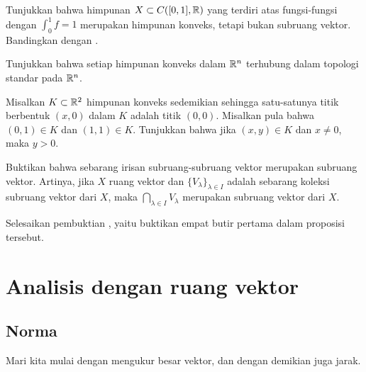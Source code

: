 \begin{exercise} \label{exercise:intoneconvex}
Tunjukkan bahwa himpunan $X \subset C([0,1],{\mathbb{R}})$ yang terdiri atas fungsi-fungsi
dengan $\int_0^1 f = 1$ merupakan himpunan konveks, tetapi bukan subruang vektor.
Bandingkan dengan .
\end{exercise}


\begin{exercise}
Tunjukkan bahwa setiap himpunan konveks dalam ${\mathbb{R}}^n$ terhubung dalam topologi
standar pada ${\mathbb{R}}^n$.
\end{exercise}

\begin{exercise}
Misalkan $K \subset {\mathbb{R}}^2$ himpunan konveks sedemikian sehingga satu-satunya titik
berbentuk $(x,0)$ dalam $K$ adalah titik $(0,0)$.  Misalkan pula bahwa
$(0,1) \in K$ dan $(1,1) \in K$.  Tunjukkan bahwa jika $(x,y) \in K$ dan $x
\neq 0$, maka $y > 0$.
\end{exercise}

\begin{exercise}
Buktikan bahwa sebarang irisan subruang-subruang vektor
merupakan subruang vektor.
Artinya, jika $X$ ruang vektor dan
$\{ V_\lambda \}_{\lambda \in I}$ adalah
sebarang koleksi subruang vektor dari $X$,
maka
$\bigcap_{\lambda \in I} V_\lambda$ merupakan subruang vektor dari $X$.
\end{exercise}

\begin{exercise}[Mudah] \label{exercise:LXYvs}
Selesaikan pembuktian , yaitu buktikan empat
butir pertama dalam proposisi tersebut.
\end{exercise}


\sectionnewpage
\section{Analisis dengan ruang vektor}
\label{sec:normsmatsdets}



\subsection{Norma}

Mari kita mulai dengan mengukur besar vektor, dan dengan demikian juga jarak.

